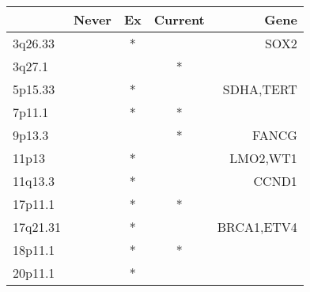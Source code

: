 \begin{tabular}{lcccr}
\toprule
{} & Never & Ex & Current &        Gene \\
\midrule
3q26.33  &       &  * &         &        SOX2 \\
3q27.1   &       &    &       * &             \\
5p15.33  &       &  * &         &   SDHA,TERT \\
7p11.1   &       &  * &       * &             \\
9p13.3   &       &    &       * &       FANCG \\
11p13    &       &  * &         &    LMO2,WT1 \\
11q13.3  &       &  * &         &       CCND1 \\
17p11.1  &       &  * &       * &             \\
17q21.31 &       &  * &         &  BRCA1,ETV4 \\
18p11.1  &       &  * &       * &             \\
20p11.1  &       &  * &         &             \\
\bottomrule
\end{tabular}
